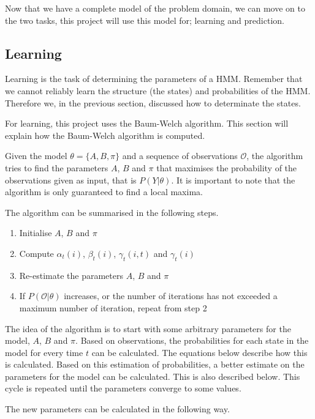 Now that we have a complete model of the problem domain, we can move on to the two tasks, this project will use this model for; learning and prediction.

\subsection{Learning}\label{sec:learner}
Learning is the task of determining the parameters of a HMM. Remember that we cannot reliably learn the structure (the states) and probabilities of the HMM. Therefore we, in the previous section, discussed how to determinate the states.

For learning, this project uses the Baum-Welch algorithm\cite{hmmIntroduction}. This section will explain how the Baum-Welch algorithm is computed.

Given the model $\theta = \{A, B, \pi\}$ and a sequence of observations $\mathcal{O}$, the algorithm tries to find the parameters $A$, $B$ and $\pi$ that maximises the probability of the observations given as input, that is $P(Y | \theta)$. It is important to note that the algorithm is only guaranteed to find a local maxima.

The algorithm can be summarised in the following steps\cite{hmmIntroduction}.

\begin{enumerate}
\item Initialise $A$, $B$ and $\pi$
\item Compute $\alpha_t(i)$, $\beta_t(i)$, $\gamma_t(i,t)$ and $\gamma_t(i)$
\item Re-estimate the parameters $A$, $B$ and $\pi$
\item If $P(\mathcal{O} | \theta)$ increases, or the number of iterations has not exceeded a maximum number of iteration, repeat from step 2
\end{enumerate}

The idea of the algorithm is to start with some arbitrary parameters for the model, $A$, $B$ and $\pi$. Based on observations, the probabilities for each state in the model for every time $t$ can be calculated. The equations below describe how this is calculated. Based on this estimation of probabilities, a better estimate on the parameters for the model can be calculated. This is also described below. This cycle is repeated until the parameters converge to some values.

The new parameters can be calculated in the following way\cite{hmmIntroduction}.

